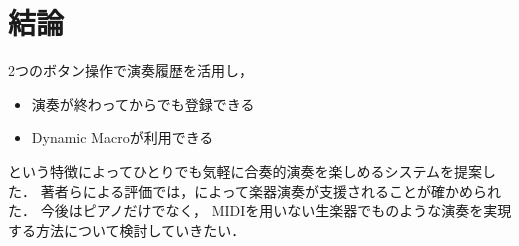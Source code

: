 \section{結論}


2つのボタン操作で演奏履歴を活用し，
\begin{itemize}
\item 演奏が終わってからでも登録できる
\item Dynamic Macroが利用できる
\end{itemize}
という特徴によってひとりでも気軽に合奏的演奏を楽しめるシステム{\system}を提案した．
著者らによる評価では，{\system}によって楽器演奏が支援されることが確かめられた．
今後はピアノだけでなく，
MIDIを用いない生楽器でも{\system}のような演奏を実現する方法について検討していきたい．
